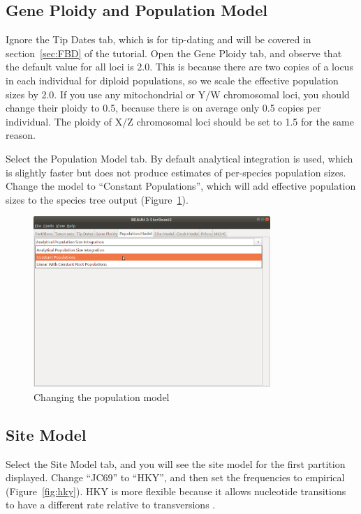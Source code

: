 \documentclass[12pt]{article}
\begin{document}
\subsection{Gene Ploidy and Population Model}
\label{subsec:ploidyAndPopModel}

Ignore the Tip Dates tab, which is for tip-dating and will be covered in
section~\ref{sec:FBD} of the tutorial. Open the Gene Ploidy tab, and observe that the default value
for all loci is 2.0. This is because there are two copies of a locus in each
individual for diploid populations, so we scale the effective population sizes
by 2.0. If you use any mitochondrial or Y/W chromosomal loci, you should
change their ploidy to 0.5, because there is on average only 0.5 copies per
individual. The ploidy of X/Z chromosomal loci should be set to 1.5 for the
same reason.

Select the Population Model tab. By default analytical integration is used,
which is slightly faster but does not produce estimates of per-species population sizes.
Change the model to ``Constant Populations'', which will add effective population
sizes to the species tree output (Figure~\ref{fig:constantPopulations}).

\begin{figure}[htb!]
\centering
\includegraphics[width=0.8\textwidth]{figures/constantPopulations.png}
\caption
{Changing the population model}
\label{fig:constantPopulations}
\end{figure}

\clearpage

\subsection{Site Model}
\label{subsec:siteModel}

Select the Site Model tab, and you will see the site model for the first partition
displayed. Change ``JC69'' to ``HKY'', and then set the frequencies to
empirical (Figure~\ref{fig:hky}).
HKY is more flexible because it allows nucleotide transitions to have a different
rate relative to transversions \citep{Hasegawa1985}.
\end{document}
